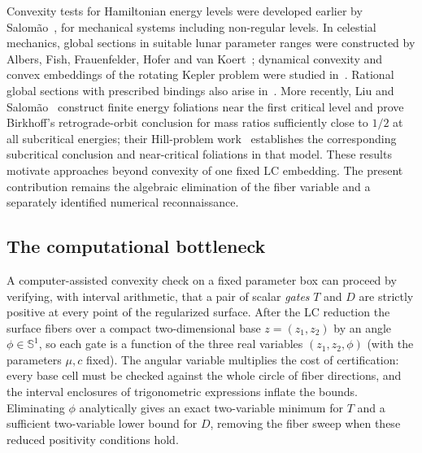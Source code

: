 \documentclass[11pt,reqno]{amsart}
\theoremstyle{plain}
\theoremstyle{definition}
\newcommand{\Sph}{\mathbb{S}}
\begin{document}
Convexity tests for Hamiltonian energy levels were developed earlier by Salom\~ao~\cite{Salomao2004}, for mechanical systems including non-regular levels. In celestial mechanics, global sections in suitable lunar parameter ranges were constructed by Albers, Fish, Frauenfelder, Hofer and van Koert~\cite{AFFHvK}; dynamical convexity and convex embeddings of the rotating Kepler problem were studied in~\cite{AFFvK,FKZ}. Rational global sections with prescribed bindings also arise in~\cite{HLS,HS}. More recently, Liu and Salom\~ao~\cite{LSPCR} construct finite energy foliations near the first critical level and prove Birkhoff's retrograde-orbit conclusion for mass ratios sufficiently close to $1/2$ at all subcritical energies; their Hill-problem work~\cite{LSHill} establishes the corresponding subcritical conclusion and near-critical foliations in that model. These results motivate approaches beyond convexity of one fixed LC embedding. The present contribution remains the algebraic elimination of the fiber variable and a separately identified numerical reconnaissance.

\subsection{The computational bottleneck}
A computer-assisted convexity check on a fixed parameter box can proceed by verifying, with interval arithmetic, that a pair of scalar \emph{gates} $T$ and $D$ are strictly positive at every point of the regularized surface. After the LC reduction the surface fibers over a compact two-dimensional base $z=(z_1,z_2)$ by an angle $\phi\in\Sph^1$, so each gate is a function of the three real variables $(z_1,z_2,\phi)$ (with the parameters $\mu,c$ fixed). The angular variable multiplies the cost of certification: every base cell must be checked against the whole circle of fiber directions, and the interval enclosures of trigonometric expressions inflate the bounds. Eliminating $\phi$ analytically gives an exact two-variable minimum for $T$ and a sufficient two-variable lower bound for $D$, removing the fiber sweep when these reduced positivity conditions hold.
\end{document}
